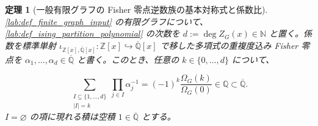 \documentclass[11pt,a4paper]{article}
\newtheorem{theorem}[definition]{定理}
\theoremstyle{remark}
\begin{document}
\begin{theorem}[一般有限グラフの Fisher 零点逆数族の基本対称式と係数比]\label{lab:theorem_reciprocal_fisher_zero_elementary_symmetric_coefficient_ratio}
\cref{lab:def_finite_graph_input}
 の有限グラフについて、
\cref{lab:def_ising_partition_polynomial}
 の次数を 
$d:=\deg Z_G(x)\in\mathbb N$
 と置く。係数を標準単射 
$\iota_{\mathbb Z[x],\overline{\mathbb Q}[x]}:\mathbb Z[x]\hookrightarrow\overline{\mathbb Q}[x]$
 で移した多項式の重複度込み Fisher 零点を 
$\alpha_1,\ldots,\alpha_d\in\overline{\mathbb Q}$
 と書く。このとき、任意の 
$k\in\{0,\ldots,d\}$
 について、

\[\sum_{\substack{I\subseteq\{1,\ldots,d\}\\|I|=k}}
\prod_{j\in I}\alpha_j^{-1}
=
(-1)^k\frac{\Omega_G(k)}{\Omega_G(0)}
\in\mathbb Q
\subset\overline{\mathbb Q}.\]
$I=\varnothing$
 の項に現れる積は空積 
$1\in\overline{\mathbb Q}$
 とする。

\end{theorem}
\end{document}
